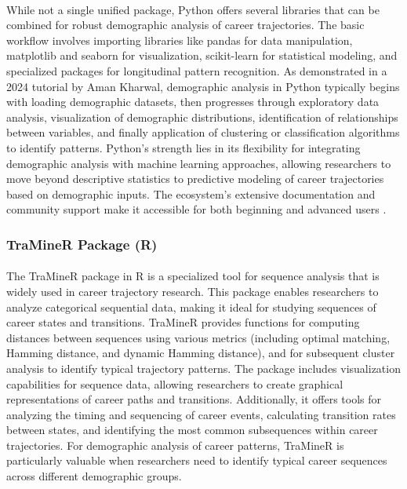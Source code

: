 \documentclass[../main.tex]{subfiles}
\begin{document}
\paragraph{} While not a single unified package, Python offers several libraries that can be combined for robust demographic analysis of career trajectories. The basic workflow involves importing libraries like pandas for data manipulation, matplotlib and seaborn for visualization, scikit-learn for statistical modeling, and specialized packages for longitudinal pattern recognition. As demonstrated in a 2024 tutorial by Aman Kharwal, demographic analysis in Python typically begins with loading demographic datasets, then progresses through exploratory data analysis, visualization of demographic distributions, identification of relationships between variables, and finally application of clustering or classification algorithms to identify patterns. Python's strength lies in its flexibility for integrating demographic analysis with machine learning approaches, allowing researchers to move beyond descriptive statistics to predictive modeling of career trajectories based on demographic inputs. The ecosystem's extensive documentation and community support make it accessible for both beginning and advanced users \citep{kharwal2024demographics}.

\subsubsection{TraMineR Package (R)}
\paragraph{} The TraMineR package in R is a specialized tool for sequence analysis that is widely used in career trajectory research. This package enables researchers to analyze categorical sequential data, making it ideal for studying sequences of career states and transitions. TraMineR provides functions for computing distances between sequences using various metrics (including optimal matching, Hamming distance, and dynamic Hamming distance), and for subsequent cluster analysis to identify typical trajectory patterns. The package includes visualization capabilities for sequence data, allowing researchers to create graphical representations of career paths and transitions. Additionally, it offers tools for analyzing the timing and sequencing of career events, calculating transition rates between states, and identifying the most common subsequences within career trajectories. For demographic analysis of career patterns, TraMineR is particularly valuable when researchers need to identify typical career sequences across different demographic groups.
\end{document}
